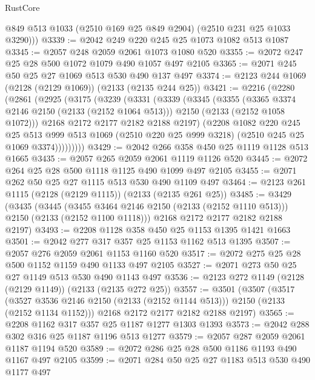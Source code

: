 \begin{lexlean}{RustCore}
\begin{coremodule}
        @849
        @513
        @1033
        (@2510 @169 @25 @849 @2904)
        (@2510 @231 @25 @1033 @3290)))
@3339 := @2042 @249 @220 @245 @25 @1073 @1082 @513 @1087
@3345 := @2057 @248 @2059 @2061 @1073 @1080 @520
@3355 := @2072 @247 @25 @28 @500 @1072 @1079 @490 @1057 @497 @2105
@3365 := @2071 @245 @50 @25 @27 @1069 @513 @530 @490 @137 @497
@3374 := @2123 @244 @1069 (@2128 (@2129 @1069)) (@2133 (@2135 @244 @25))
@3421 := @2216
    (@2280
      (@2861
        (@2925
          (@3175
            (@3239
              (@3331
                (@3339
                  (@3345
                    (@3355
                      (@3365 @3374 @2146 @2150 (@2133 (@2152 @1064 @513)))
                      @2150
                      (@2133 (@2152 @1058 @1072)))
                    @2168
                    @2172
                    @2177
                    @2182
                    @2188
                    @2197)
                  (@2208
                    @1082
                    @220
                    @245
                    @25
                    @513
                    @999
                    @513
                    @1069
                    (@2510 @220 @25 @999 @3218)
                    (@2510 @245 @25 @1069 @3374)))))))))
@3429 := @2042 @266 @358 @450 @25 @1119 @1128 @513 @1665
@3435 := @2057 @265 @2059 @2061 @1119 @1126 @520
@3445 := @2072 @264 @25 @28 @500 @1118 @1125 @490 @1099 @497 @2105
@3455 := @2071 @262 @50 @25 @27 @1115 @513 @530 @490 @1109 @497
@3464 := @2123 @261 @1115 (@2128 (@2129 @1115)) (@2133 (@2135 @261 @25))
@3485 := @3429
    (@3435
      (@3445 (@3455 @3464 @2146 @2150 (@2133 (@2152 @1110 @513))) @2150 (@2133 (@2152 @1100 @1118)))
      @2168
      @2172
      @2177
      @2182
      @2188
      @2197)
@3493 := @2208 @1128 @358 @450 @25 @1153 @1395 @1421 @1663
@3501 := @2042 @277 @317 @357 @25 @1153 @1162 @513 @1395
@3507 := @2057 @276 @2059 @2061 @1153 @1160 @520
@3517 := @2072 @275 @25 @28 @500 @1152 @1159 @490 @1133 @497 @2105
@3527 := @2071 @273 @50 @25 @27 @1149 @513 @530 @490 @1143 @497
@3536 := @2123 @272 @1149 (@2128 (@2129 @1149)) (@2133 (@2135 @272 @25))
@3557 := @3501
    (@3507
      (@3517 (@3527 @3536 @2146 @2150 (@2133 (@2152 @1144 @513))) @2150 (@2133 (@2152 @1134 @1152)))
      @2168
      @2172
      @2177
      @2182
      @2188
      @2197)
@3565 := @2208 @1162 @317 @357 @25 @1187 @1277 @1303 @1393
@3573 := @2042 @288 @302 @316 @25 @1187 @1196 @513 @1277
@3579 := @2057 @287 @2059 @2061 @1187 @1194 @520
@3589 := @2072 @286 @25 @28 @500 @1186 @1193 @490 @1167 @497 @2105
@3599 := @2071 @284 @50 @25 @27 @1183 @513 @530 @490 @1177 @497

\end{coremodule}
\end{lexlean}
